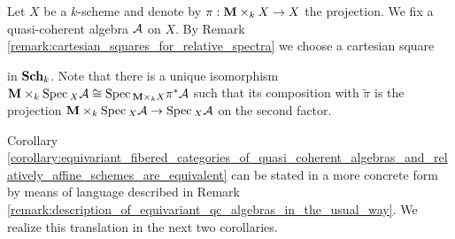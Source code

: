 \begin{remark}\label{remark:identification_of_spec_of_pullback_along_pi_with_product}
Let $X$ be a $k$-scheme and denote by $\pi:\mathbf{M}\times_kX\rightarrow X$ the projection. We fix a quasi-coherent algebra ${\mathcal A}$ on $X$. By Remark \ref{remark:cartesian_squares_for_relative_spectra} we choose a cartesian square
\begin{center}
\end{center}
in $\mathbf{Sch}_k$. Note that there is a unique isomorphism $\mathbf{M}\times_k\mathrm{Spec}\,_X{\mathcal A} \cong \mathrm{Spec}\,_{\mathbf{M}\times_kX}\pi^*{\mathcal A}$ such that its composition with $\widetilde{\pi}$ is the projection $\mathbf{M}\times_k\mathrm{Spec}\,_X{\mathcal A}\rightarrow \mathrm{Spec}\,_X{\mathcal A}$ on the second factor.
\end{remark}
\noindent
Corollary \ref{corollary:equivariant_fibered_categories_of_quasi_coherent_algebras_and_relatively_affine_schemes_are_equivalent} can be stated in a more concrete form by means of language described in Remark \ref{remark:description_of_equivariant_qc_algebras_in_the_usual_way}. We realize this translation in the next two corollaries.

